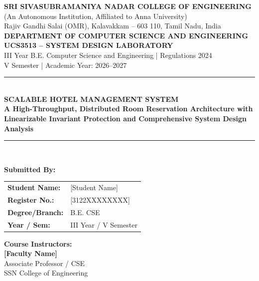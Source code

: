 \documentclass[11pt,a4paper]{article}
\begin{document}
\hypersetup{pageanchor=false}

\begin{titlepage}
    \centering
    \vspace*{0.5cm}
    
    {\Large \textbf{SRI SIVASUBRAMANIYA NADAR COLLEGE OF ENGINEERING}}\\[0.2cm]
    {\large (An Autonomous Institution, Affiliated to Anna University)}\\[0.2cm]
    {\normalsize Rajiv Gandhi Salai (OMR), Kalavakkam -- 603 110, Tamil Nadu, India}\\[1.2cm]
    
    {\large \textbf{DEPARTMENT OF COMPUTER SCIENCE AND ENGINEERING}}\\[0.6cm]
    {\large \textbf{UCS3513 -- SYSTEM DESIGN LABORATORY}}\\[0.2cm]
    {\normalsize III Year B.E. Computer Science and Engineering | Regulations 2024}\\[0.2cm]
    {\normalsize V Semester | Academic Year: 2026--2027}\\[1.0cm]
    
    \rule{\linewidth}{1.2pt}\\[0.4cm]
    {\LARGE \textbf{SCALABLE HOTEL MANAGEMENT SYSTEM}}\\[0.3cm]
    {\large \textbf{A High-Throughput, Distributed Room Reservation Architecture with Linearizable Invariant Protection and Comprehensive System Design Analysis}}\\[0.4cm]
    \rule{\linewidth}{1.2pt}\\[1.2cm]
    
    \begin{minipage}{0.48\textwidth}
        \textbf{Submitted By:}\\[0.2cm]
        \begin{tabular}{ll}
            \textbf{Student Name:} & [Student Name] \\
            \textbf{Register No.:} & [3122XXXXXXXX] \\
            \textbf{Degree/Branch:} & B.E. CSE \\
            \textbf{Year / Sem:} & III Year / V Semester \\
        \end{tabular}
    \end{minipage}
    \hfill
    \begin{minipage}{0.48\textwidth}
        \begin{flushright}
            \textbf{Course Instructors:}\\[0.2cm]
            \textbf{[Faculty Name]}\\[0.1cm]
            Associate Professor / CSE\\[0.1cm]
            SSN College of Engineering
        \end{flushright}
    \end{minipage}
    

\end{titlepage}
\end{document}
